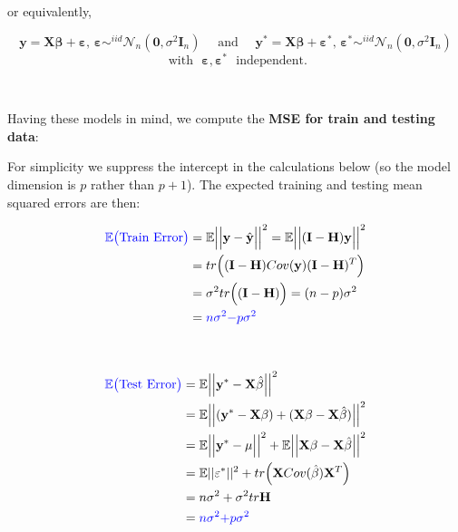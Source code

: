 \documentclass[
]{book}
\begin{document}
or equivalently,

\[ \mathbf{y} = \mathbf{X}\mathbf{\beta} + \mathbf{\varepsilon},\, \mathbf{\varepsilon} \sim^{iid} \mathcal{N}_n(\mathbf{0},\sigma^2 \mathbf{I}_n) \quad \text{ and } \quad \mathbf{y}^* =\mathbf{X}\mathbf{\beta} + \mathbf{\varepsilon}^*,\, \mathbf{\varepsilon}^* \sim^{iid} \mathcal{N}_n(\mathbf{0},\sigma^2 \mathbf{I}_n) \]
\[ \text{ with }\,\, \mathbf{\varepsilon},  \mathbf{\varepsilon}^* \,\,  \text{ independent}.\]

~

Having these models in mind, we compute the \textbf{MSE for train and testing data}:~

For simplicity we suppress the intercept in the calculations below (so the model dimension is \(p\) rather than \(p+1\)). The expected training and testing mean squared errors are then:

\begin{align*}
{\color{blue} {\mathbb{E}\bigl(\text{Train Error}\bigr)}} & =  \mathbb{E}\Bigl|\Bigl|\mathbf{y}-\hat{\mathbf{y}} \Bigr|\Bigr|^2=\mathbb{E}\Bigl|\Bigl|(\mathbf{I - H})\mathbf{y}\Bigr|\Bigr|^2\\
  &=tr \Bigl((\mathbf{I - H})Cov(\mathbf{y})(\mathbf{I - H})^T \Bigr)\\
  & = \sigma^2 tr\Bigl( (\mathbf{I - H}) \Bigr)=  (n-p) \sigma^2\\
  &= {\color{blue} {n\sigma^2 \mathbf{-} p \sigma^2}}\\
\end{align*}

~

\begin{align*}
{\color{blue} {\mathbb{E}\bigl(\text{Test Error} \bigr)}} & = \mathbb{E}\Bigl|\Bigl|\mathbf{y}^*-\mathbf{X}\hat{\mathbf{\beta}}\Bigr|\Bigr|^2\\
&= \mathbb{E}\Bigl|\Bigl|(\mathbf{y}^*- \mathbf{X} \mathbf{\beta})+(\mathbf{X} \mathbf{\beta}-\mathbf{X}\hat{\mathbf{\beta}})\Bigr|\Bigr|^2\\
&= \mathbb{E}\Bigl|\Bigl|\mathbf{y}^* -\mathbf{\mu}\Bigr|\Bigr|^2 + \mathbb{E}\Bigl|\Bigl|\mathbf{X} \mathbf{\beta}-\mathbf{X}\hat{\mathbf{\beta}}\Bigr|\Bigr|^2\\
&= \mathbb{E}||\mathbf{\varepsilon}^*||^2 + tr\Bigl(\mathbf{X}Cov(\hat{\mathbf{\beta}})\mathbf{X}^T \Bigr)\\
&= n \sigma^2 +\sigma^2 tr\mathbf{H}\\
&= {\color{blue} {n \sigma^2 \mathbf{+}  p \sigma^2}}\\
\end{align*}
\end{document}
